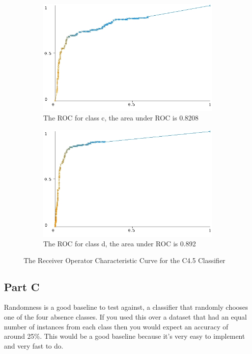 \documentclass[10pt]{article}
\begin{document}
\begin{figure}[ht]
\begin{subfigure}[b]{0.475\textwidth}
        \includegraphics[width=\textwidth]{c45_roc/roc_curve_c.jpg}
        \caption[]%
        {{\small The ROC for class c, the area under ROC is 0.8208}}    
        \label{fig:c45 roc curve class c}
    \end{subfigure}
    \quad
    \begin{subfigure}[b]{0.475\textwidth}   
        \centering 
        \includegraphics[width=\textwidth]{c45_roc/roc_curve_e(d).jpg}
        \caption[]%
        {{\small The ROC for class d, the area under ROC is 0.892}}    
        \label{fig:c45 roc curve class d}
    \end{subfigure}
    \caption[ ]
    {\small The Receiver Operator Characteristic Curve for the C4.5 Classifier} 
    \label{fig:c45 roc curves}
\end{figure}



\subsection*{Part C}
Randomness is a good baseline to test against, a classifier that randomly chooses one of the four absence classes. If you used this over a dataset that had an equal number of instances from each class then you would expect an accuracy of around 25\%. This would be a good baseline because it's very easy to implement and very fast to do. 
\end{document}
